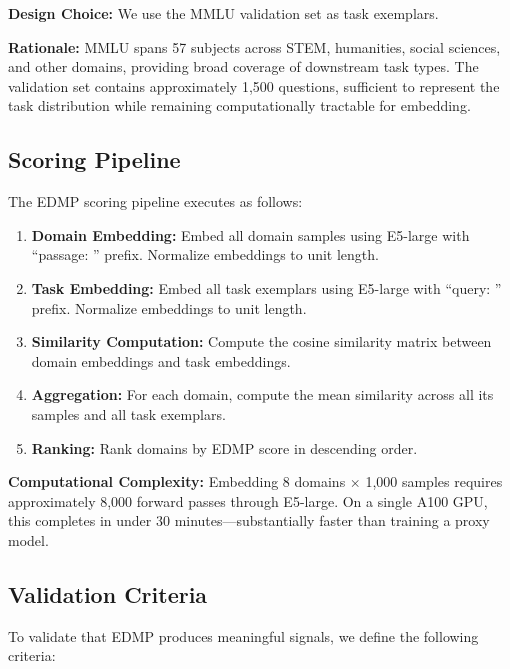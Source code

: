 \textbf{Design Choice:} We use the MMLU validation set as task exemplars.

\textbf{Rationale:} MMLU \cite{hendrycks2021measuring} spans 57 subjects across STEM, humanities, social sciences, and other domains, providing broad coverage of downstream task types. The validation set contains approximately 1,500 questions, sufficient to represent the task distribution while remaining computationally tractable for embedding.

\subsection{Scoring Pipeline}

The EDMP scoring pipeline executes as follows:

\begin{enumerate}
    \item \textbf{Domain Embedding:} Embed all domain samples using E5-large with ``passage: '' prefix. Normalize embeddings to unit length.

    \item \textbf{Task Embedding:} Embed all task exemplars using E5-large with ``query: '' prefix. Normalize embeddings to unit length.

    \item \textbf{Similarity Computation:} Compute the cosine similarity matrix between domain embeddings and task embeddings.

    \item \textbf{Aggregation:} For each domain, compute the mean similarity across all its samples and all task exemplars.

    \item \textbf{Ranking:} Rank domains by EDMP score in descending order.
\end{enumerate}

\textbf{Computational Complexity:} Embedding 8 domains $\times$ 1,000 samples requires approximately 8,000 forward passes through E5-large. On a single A100 GPU, this completes in under 30 minutes---substantially faster than training a proxy model.

\subsection{Validation Criteria}

To validate that EDMP produces meaningful signals, we define the following criteria:

